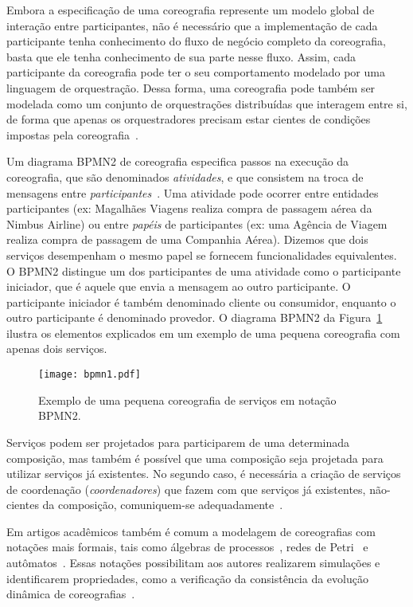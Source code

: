 Embora a especificação de uma coreografia represente um modelo global de interação entre participantes,
não é necessário que a implementação de cada participante tenha conhecimento do fluxo de negócio completo da coreografia,
basta que ele tenha conhecimento de sua parte nesse fluxo.
Assim, cada participante da coreografia pode ter o seu comportamento modelado por uma linguagem de orquestração. Dessa forma, uma coreografia pode também ser modelada como um conjunto de orquestrações distribuídas que interagem entre si, de forma que apenas os orquestradores precisam estar cientes de condições impostas pela coreografia~\cite{Poulin2011Collaboration}. 

Um diagrama BPMN2 de coreografia especifica passos na execução da coreografia, que são denominados \emph{atividades}, e que consistem na troca de mensagens entre \emph{participantes}~\cite{BPMN2011}. Uma atividade pode ocorrer entre entidades participantes (ex: Magalhães Viagens realiza compra de passagem aérea da Nimbus Airline) ou entre \emph{papéis} de participantes (ex: uma Agência de Viagem realiza compra de passagem de uma Companhia Aérea). Dizemos que dois serviços desempenham o mesmo papel se fornecem funcionalidades equivalentes. O BPMN2 distingue um dos participantes de uma atividade como o participante iniciador, que é aquele que envia a mensagem ao outro participante. O participante iniciador é também denominado cliente ou consumidor, enquanto o outro participante é denominado provedor. O diagrama BPMN2 da Figura~\ref{fig:bpmn1} ilustra os elementos explicados em um exemplo de uma pequena coreografia com apenas dois serviços.

\begin{figure}[!h]
  \centering
  \texttt{[image: bpmn1.pdf]} 
  \caption{Exemplo de uma pequena coreografia de serviços em notação BPMN2.}
  \label{fig:bpmn1} 
\end{figure}

Serviços podem ser projetados para participarem de uma determinada composição, mas também é possível que uma composição seja projetada para utilizar serviços já existentes. No segundo caso, é necessária a criação de serviços de coordenação (\emph{coordenadores}) que fazem com que serviços já existentes, não-cientes da composição, comuniquem-se adequadamente~\cite{Autili2013Synthesis}. 

Em artigos acadêmicos também é comum a modelagem de coreografias com notações mais formais, tais como álgebras de processos~\cite{Roohi2011Realizability}, redes de Petri~\cite{Cicirelli2010Dynamically} e autômatos~\cite{Rinderle2006Evolution}. Essas notações possibilitam aos autores realizarem simulações e identificarem propriedades, como a verificação da consistência da evolução dinâmica de coreografias~\cite{Cicirelli2010Dynamically}. 

